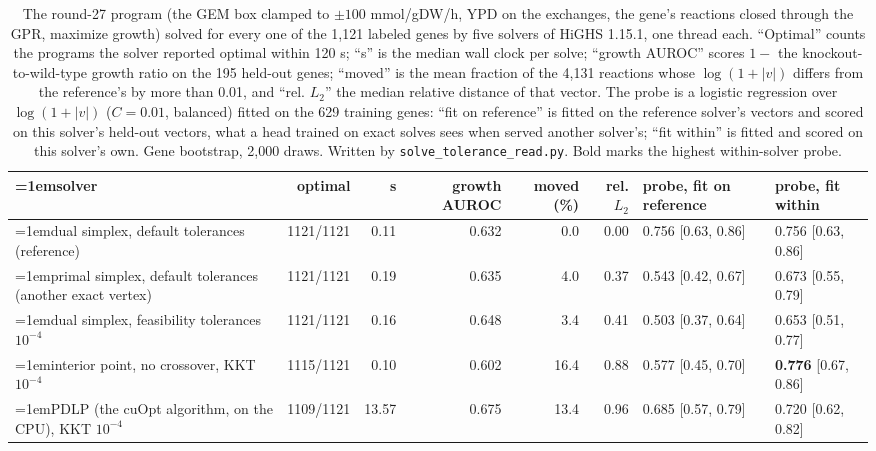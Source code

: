\begin{table}[H]
  \centering
  \scriptsize
  \setlength{\tabcolsep}{2.5pt}
  \caption[The solve across solvers]{The round-27 program (the GEM box clamped to $\pm100$ mmol/gDW/h, YPD on the exchanges, the gene's reactions closed through the GPR, maximize growth) solved for every one of the 1,121 labeled genes by five solvers of HiGHS 1.15.1, one thread each. ``Optimal'' counts the programs the solver reported optimal within 120 s; ``s'' is the median wall clock per solve; ``growth AUROC'' scores $1 - $ the knockout-to-wild-type growth ratio on the 195 held-out genes; ``moved'' is the mean fraction of the 4,131 reactions whose $\log(1 + |v|)$ differs from the reference's by more than 0.01, and ``rel. $L_2$'' the median relative distance of that vector. The probe is a logistic regression over $\log(1 + |v|)$ ($C = 0.01$, balanced) fitted on the 629 training genes: ``fit on reference'' is fitted on the reference solver's vectors and scored on this solver's held-out vectors, what a head trained on exact solves sees when served another solver's; ``fit within'' is fitted and scored on this solver's own. Gene bootstrap, 2,000 draws. Written by \texttt{solve\_tolerance\_read.py}. Bold marks the highest within-solver probe.}
  \label{tab:solve-tolerance}
  \begin{tabular}{@{}>{\raggedright\hangindent=1em\hangafter=1\arraybackslash}p{58.8mm}rrrrrll@{}}
    \hline
    solver & optimal & s & growth AUROC & moved (\%) & rel. $L_2$ & probe, fit on reference & probe, fit within \\
    \hline
    dual simplex, default tolerances (reference) & 1121/1121 & 0.11 & 0.632 & 0.0 & 0.00 & 0.756 [0.63, 0.86] & 0.756 [0.63, 0.86] \\
    primal simplex, default tolerances (another exact vertex) & 1121/1121 & 0.19 & 0.635 & 4.0 & 0.37 & 0.543 [0.42, 0.67] & 0.673 [0.55, 0.79] \\
    dual simplex, feasibility tolerances $10^{-4}$ & 1121/1121 & 0.16 & 0.648 & 3.4 & 0.41 & 0.503 [0.37, 0.64] & 0.653 [0.51, 0.77] \\
    interior point, no crossover, KKT $10^{-4}$ & 1115/1121 & 0.10 & 0.602 & 16.4 & 0.88 & 0.577 [0.45, 0.70] & \textbf{0.776} [0.67, 0.86] \\
    PDLP (the cuOpt algorithm, on the CPU), KKT $10^{-4}$ & 1109/1121 & 13.57 & 0.675 & 13.4 & 0.96 & 0.685 [0.57, 0.79] & 0.720 [0.62, 0.82] \\
    \hline
  \end{tabular}
\end{table}
